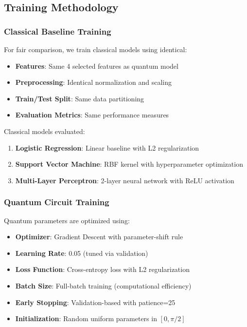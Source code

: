 \documentclass[conference]{IEEEtran}
\begin{document}
\subsection{Training Methodology}

\subsubsection{Classical Baseline Training}
For fair comparison, we train classical models using identical:
\begin{itemize}
    \item \textbf{Features}: Same 4 selected features as quantum model
    \item \textbf{Preprocessing}: Identical normalization and scaling
    \item \textbf{Train/Test Split}: Same data partitioning
    \item \textbf{Evaluation Metrics}: Same performance measures
\end{itemize}

Classical models evaluated:
\begin{enumerate}
    \item \textbf{Logistic Regression}: Linear baseline with L2 regularization
    \item \textbf{Support Vector Machine}: RBF kernel with hyperparameter optimization
    \item \textbf{Multi-Layer Perceptron}: 2-layer neural network with ReLU activation
\end{enumerate}

\subsubsection{Quantum Circuit Training}
Quantum parameters are optimized using:
\begin{itemize}
    \item \textbf{Optimizer}: Gradient Descent with parameter-shift rule
    \item \textbf{Learning Rate}: 0.05 (tuned via validation)
    \item \textbf{Loss Function}: Cross-entropy loss with L2 regularization
    \item \textbf{Batch Size}: Full-batch training (computational efficiency)
    \item \textbf{Early Stopping}: Validation-based with patience=25
    \item \textbf{Initialization}: Random uniform parameters in $[0, \pi/2]$
\end{itemize}
\end{document}
